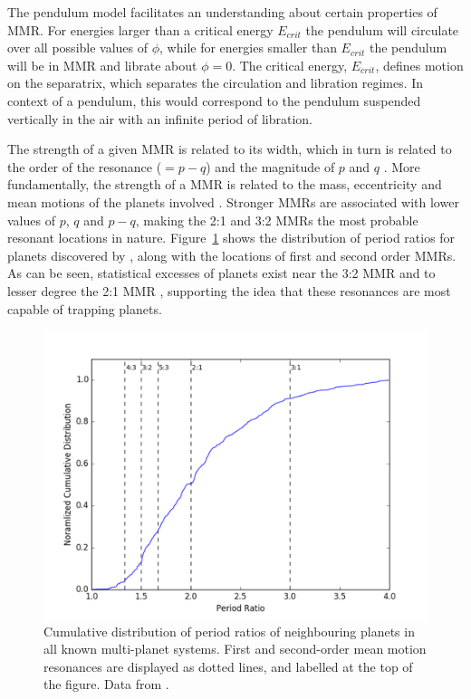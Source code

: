 The pendulum model facilitates an understanding about certain properties of MMR. 
For energies larger than a critical energy $E_{crit}$ the pendulum will circulate over all possible values of $\phi$, while for energies smaller than $E_{crit}$ the pendulum will be in MMR and librate about $\phi = 0$.
The critical energy, $E_{crit}$, defines motion on the separatrix, which separates the circulation and libration regimes. 
In context of a pendulum, this would correspond to the pendulum suspended vertically in the air with an infinite period of libration. 

The strength of a given MMR is related to its width, which in turn is related to the order of the resonance ($= p - q$) and the magnitude of $p$ and $q$ \citep{SSD1999}. 
More fundamentally, the strength of a MMR is related to the mass, eccentricity and mean motions of the planets involved \citep{SSD1999}.
Stronger MMRs are associated with lower values of $p$, $q$ and $p-q$, making the 2:1 and 3:2 MMRs the most probable resonant locations in nature. 
Figure~\ref{fig:KepMMR} shows the distribution of period ratios for planets discovered by \kep, along with the locations of first and second order MMRs. 
As can be seen, statistical excesses of planets exist near the 3:2 MMR and to lesser degree the 2:1 MMR \citep{Lissauer2011,Fabrycky2014,Steffen2015}, supporting the idea that these resonances are most capable of trapping planets.

\begin{figure}
\centering
\includegraphics[width=1.00\textwidth]{intro/PeriodRatios}
\caption{
Cumulative distribution of period ratios of neighbouring planets in all known multi-planet systems.
 First and second-order mean motion resonances are displayed as dotted lines, and labelled at the top of the figure. 
 Data from \citet{NASAEA}.}
\label{fig:KepMMR}
\end{figure}

